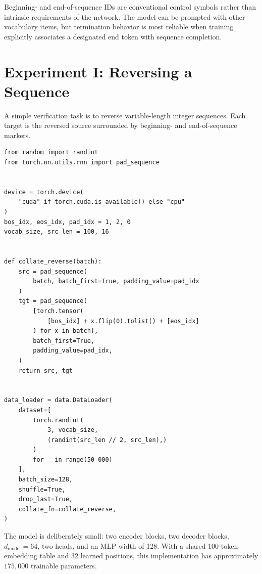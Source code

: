 \documentclass[11pt]{article}
\begin{document}
Beginning- and end-of-sequence IDs are conventional control symbols rather than intrinsic requirements of the network. The model can be prompted with other vocabulary items, but termination behavior is most reliable when training explicitly associates a designated end token with sequence completion.

\section{Experiment I: Reversing a Sequence}
\label{sec:reverse}

A simple verification task is to reverse variable-length integer sequences. Each target is the reversed source surrounded by beginning- and end-of-sequence markers.

\begin{lstlisting}[caption={Synthetic reversal dataset.},label={lst:reverse_data}]
from random import randint
from torch.nn.utils.rnn import pad_sequence


device = torch.device(
    "cuda" if torch.cuda.is_available() else "cpu"
)
bos_idx, eos_idx, pad_idx = 1, 2, 0
vocab_size, src_len = 100, 16


def collate_reverse(batch):
    src = pad_sequence(
        batch, batch_first=True, padding_value=pad_idx
    )
    tgt = pad_sequence(
        [torch.tensor(
            [bos_idx] + x.flip(0).tolist() + [eos_idx]
        ) for x in batch],
        batch_first=True,
        padding_value=pad_idx,
    )
    return src, tgt


data_loader = data.DataLoader(
    dataset=[
        torch.randint(
            3, vocab_size,
            (randint(src_len // 2, src_len),)
        )
        for _ in range(50_000)
    ],
    batch_size=128,
    shuffle=True,
    drop_last=True,
    collate_fn=collate_reverse,
)
\end{lstlisting}

The model is deliberately small: two encoder blocks, two decoder blocks, $d_{\mathrm{model}}=64$, two heads, and an MLP width of 128. With a shared 100-token embedding table and 32 learned positions, this implementation has approximately $175{,}000$ trainable parameters.
\end{document}
